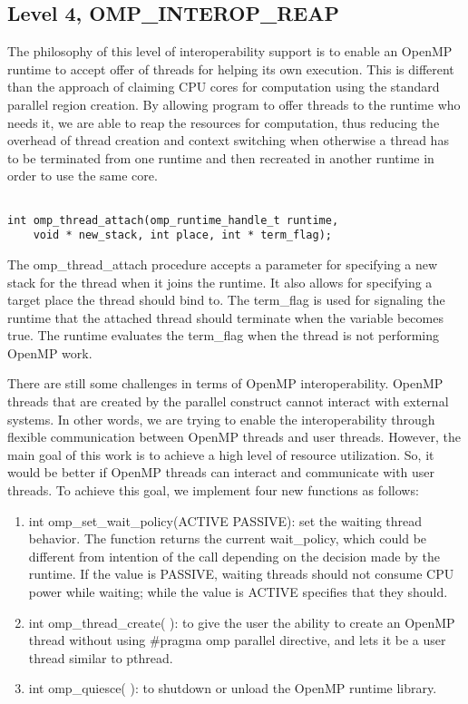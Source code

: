 {\subsection{Level 4, OMP\_INTEROP\_REAP} 
The philosophy of this level of interoperability support is to enable an OpenMP runtime to accept offer of threads 
for helping its own execution. This is different than the approach of claiming CPU cores 
for computation using the standard parallel region creation. By allowing program to offer threads to the runtime who needs it, we are able to 
reap the resources for computation, thus reducing the overhead of thread creation and context switching when otherwise 
a thread has to be terminated from
one runtime and then recreated in another runtime in order to use the same core. 
\lstset{basicstyle=\sffamily\small,language=c, numbersep=1pt}
\begin{lstlisting}[frame=single]  % Start your code-block

int omp_thread_attach(omp_runtime_handle_t runtime, 
    void * new_stack, int place, int * term_flag);
\end{lstlisting}

The {\sf omp\_thread\_attach} procedure accepts a parameter for specifying a new stack for the thread when it joins the runtime. It also 
allows for specifying a target place the thread should bind to. 
The {\sf term\_flag} 
is used for signaling the runtime that the attached thread should terminate when the variable becomes true. 
The runtime evaluates the {\sf term\_flag} when the thread is not performing OpenMP work. 



There are still some challenges in terms of OpenMP interoperability. 
OpenMP threads that are created by the parallel construct cannot interact with external systems. 
In other words, we are trying to enable the interoperability through flexible communication between OpenMP threads and user threads. 
However, the main goal of this work is to achieve a high level of resource utilization. So, it would be better if OpenMP threads can interact and communicate with user threads. To achieve this goal, we implement four new functions as follows:
\begin{enumerate}
	\item int omp{\_}set{\_}wait{\_}policy(ACTIVE \textbar PASSIVE): 
	set the waiting thread behavior. The function returns the current wait{\_}policy, which could be different from intention of the call depending on the decision made by the runtime. If the value is PASSIVE, waiting threads should not consume CPU power while waiting; while the value is ACTIVE specifies that they should.
	\item int omp{\_}thread{\_}create( ): 
	to give the user the ability to create an OpenMP thread without using \#pragma omp parallel directive, and lets it be a user thread similar to pthread.
	\item int omp{\_}quiesce( ): 
	to shutdown or unload the OpenMP runtime library.
\end{enumerate}
}
